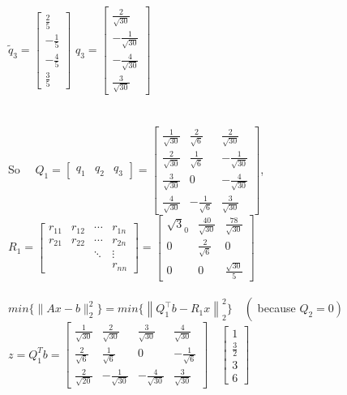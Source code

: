 \documentclass[english,onecolumn]{IEEEtran}
\begin{document}
\begin{enumerate}
$\tilde{q}_{3}=\left[\begin{array}{c}\frac{2}{5} \\ -\frac{1}{5} \\ -\frac{4}{5} \\ \frac{3}{5}\end{array}\right]$
$q_{3}=\left[\begin{array}{c}\frac{2}{\sqrt{30}} \\ -\frac{1}{\sqrt{30}} \\ -\frac{4}{\sqrt{30}} \\ \frac{3}{\sqrt{30}}\end{array}\right]$\\ 
\\\\So $ \quad Q_{1}=\left[\begin{array}{lll}q_{1} & q_{2} & q_{3}\end{array}\right]=\left[\begin{array}{ccc}\frac{1}{\sqrt{30}} & \frac{2}{\sqrt{6}} & \frac{2}{\sqrt{30}} \\ \frac{2}{\sqrt{30}} & \frac{1}{\sqrt{6}} & -\frac{1}{\sqrt{30}} \\ \frac{3}{\sqrt{30}} & 0 & -\frac{4}{\sqrt{30}} \\ \frac{4}{\sqrt{30}} & -\frac{1}{\sqrt{6}} & \frac{3}{\sqrt{30}}\end{array}\right]$, \quad
$R_{1}=\left[\begin{array}{cccc}r_{11} & r_{12} & \cdots & r_{1 n} \\ r_{21} & r_{22} & \cdots & r_{2 n} \\ & & \ddots & \vdots \\ & & & r_{n n}\end{array}\right]=\left[\begin{array}{ccc}\sqrt{3}_{0} & \frac{{40}}{\sqrt{30}} & \frac{78}{\sqrt{30}} \\ 0 & \frac{2}{\sqrt{6}} & 0 \\ 0 & 0 & \frac{\sqrt{30}}{5}\end{array}\right]$\\\\
$min\{\|A x-b\|_{2}^{2}\}=min\{\left\|Q_{1}^{\top} b-R_{1} x\right\|_{2}^{2}\} \quad\left(\right.$ because $\left.Q_{2}= 0 \right)$
\\
$z=Q_{1}^{T} b=\left[\begin{array}{cccc}\frac{1}{\sqrt{30}} & \frac{2}{\sqrt{30}} & \frac{3}{\sqrt{30}} & \frac{4}{\sqrt{30}} \\ \frac{2}{\sqrt{6}} & \frac{1}{\sqrt{6}} & 0 & -\frac{1}{\sqrt{6}} \\ \frac{2}{\sqrt{20}} & -\frac{1}{\sqrt{30}} & -\frac{4}{\sqrt{30}} & \frac{3}{\sqrt{30}}\end{array}\right] \quad\left[\begin{array}{c}1 \\ \frac{3}{2} \\ 3 \\ 6\end{array}\right]$

\end{enumerate}
\end{document}
